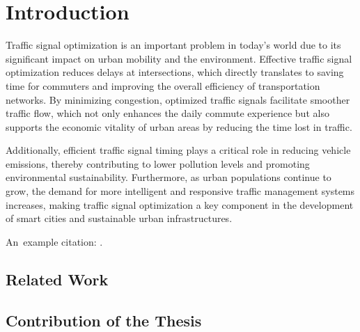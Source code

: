 \chapter*{Introduction}

%
%
%
%

Traffic signal optimization is an important problem in today's world due to its
significant impact on urban mobility and the environment. Effective traffic
signal optimization reduces delays at intersections, which directly translates
to saving time for commuters and improving the overall efficiency of
transportation networks. By minimizing congestion, optimized traffic signals
facilitate smoother traffic flow, which not only enhances the daily commute
experience but also supports the economic vitality of urban areas by reducing
the time lost in traffic.

Additionally, efficient traffic signal timing plays a
critical role in reducing vehicle emissions, thereby contributing to lower
pollution levels and promoting environmental sustainability. Furthermore, as
urban populations continue to grow, the demand for more intelligent and
responsive traffic management systems increases, making traffic signal
optimization a key component in the development of smart cities and sustainable
urban infrastructures.

An~example citation: \cite{google2023google} \cite{rodrigues2023principled} \cite{li2022building} \cite{fortin2012deap}.

\section*{Related Work} \label{sec:related_work}

\section*{Contribution of the Thesis} \label{sec:contribution_of_the_thesis}
